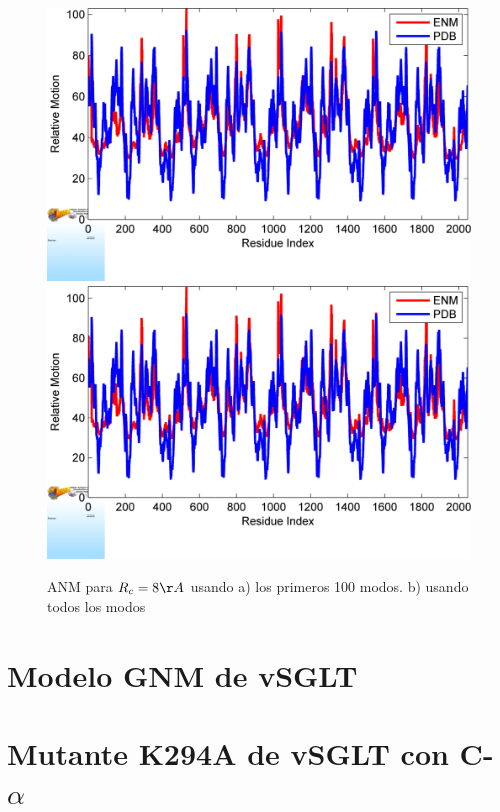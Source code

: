 \begin{figure}
 \centering
  \includegraphics[scale=0.3]{./Kap4/ANM/Ca/BF_plot_100.png}
 \includegraphics[scale=0.3]{./Kap4/ANM/Ca/BF_plot.png}
 \caption{ANM para $R_c=8\AA$ usando a) los primeros 100 modos. b) usando todos los modos}
\end{figure}
\section{Modelo GNM de vSGLT}

\section{Mutante K294A de vSGLT con C-$\alpha$}
